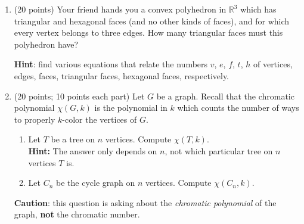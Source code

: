 \documentclass[11pt]{article}
\begin{document}
\begin{enumerate}
\pagebreak

\item (20 points) Your friend hands you a convex polyhedron in $\mathbb{R}^3$ which has triangular and hexagonal faces (and no other kinds of faces), and for which every vertex belongs to three edges. How many triangular faces must this polyhedron have? 

{\bf Hint}: find various equations that relate the numbers $v$, $e$, $f$, $t$, $h$ of vertices, edges, faces, triangular faces, hexagonal faces, respectively.


\item (20 points; 10 points each part) Let $G$ be a graph. Recall that the chromatic polynomial $\chi(G,k)$ is the polynomial in $k$ which counts the number of ways to properly $k$-color the vertices of $G$.\begin{enumerate}
\item Let $T$ be a tree on $n$ vertices. Compute $\chi(T,k)$. \\
{\bf Hint:} The answer only depends on $n$, not which particular tree on $n$ vertices $T$ is.
\item Let $C_n$ be the cycle graph on $n$ vertices. Compute $\chi(C_n,k)$.
\end{enumerate}
{\bf Caution}: this question is asking about the \emph{chromatic polynomial} of the graph, {\bf not} the chromatic number.

\end{enumerate}
\end{document}
